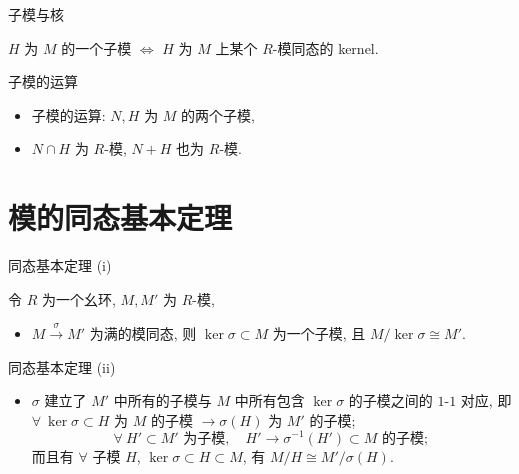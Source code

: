 
\begin{frame}{子模与核}

\begin{prop}[子模与核]
$H$ 为 $M$ 的一个子模 $\iff$ $H$ 为 $M$ 上某个 $R$-模同态的 kernel.
\end{prop}

\end{frame}


\begin{frame}{子模的运算}

\begin{itemize}
\item 子模的运算: $N, H$ 为 $M$ 的两个子模,
\item $N \cap H$ 为 $R$-模, $N + H$ 也为 $R$-模.
\end{itemize}

\end{frame}


\section[基本定理]{模的同态基本定理}


\begin{frame}{同态基本定理 (i)}

\begin{lem}[模的同态基本定理]
令 $R$ 为一个幺环, $M, M'$ 为 $R$-模,
\begin{itemize}
\item[(i)] $M \xrightarrow{\ \sigma\ } M'$ 为满的模同态,
  则 $\ker \sigma \subset M$ 为一个子模, 且
  $M/\ker\sigma \cong M'$.
\end{itemize}
\end{lem}

\end{frame}


\begin{frame}{同态基本定理 (ii)}

\begin{lem}[模的同态基本定理 (续)]
\begin{itemize}
\item[(ii)] $\sigma$ 建立了 $M'$ 中所有的子模与 $M$ 中所有包含 $\ker \sigma$
  的子模之间的 $1$-$1$ 对应,
  即 $\forall\ \ker \sigma \subset H$ 为 $M$ 的子模
  $\to \sigma(H)$ 为 $M'$ 的子模;
  \[
  \forall\ H' \subset M' \text{ 为子模}, \quad
  H' \to \sigma^{-1}(H') \subset M \text{ 的子模};
  \]
  而且有 $\forall$ 子模 $H$, $\ker \sigma \subset H \subset M$, 有
  $M/H \cong M'/\sigma(H)$.
\end{itemize}
\end{lem}

\end{frame}

